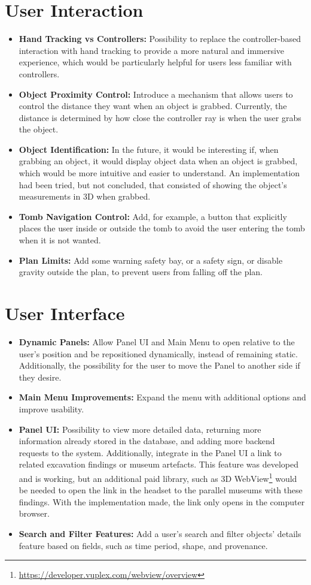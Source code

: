\section*{User Interaction}
\begin{itemize}
    \item \textbf{Hand Tracking vs Controllers:} Possibility to replace the controller-based interaction with hand tracking to provide a more natural and immersive experience, which would be particularly helpful for users less familiar with controllers.
    \item \textbf{Object Proximity Control:} Introduce a mechanism that allows users to control the distance they want when an object is grabbed. Currently, the distance is determined by how close the controller ray is when the user grabs the object.
    \item \textbf{Object Identification:} In the future, it would be interesting if, when grabbing an object, it would display object data when an object is grabbed, which would be more intuitive and easier to understand. An implementation had been tried, but not concluded, that consisted of showing the object's measurements in \gls{3D} when grabbed.
    \item \textbf{Tomb Navigation Control:} Add, for example, a button that explicitly places the user inside or outside the tomb to avoid the user entering the tomb when it is not wanted.
    \item \textbf{Plan Limits:} Add some warning safety bay, or a safety sign, or disable gravity outside the plan, to prevent users from falling off the plan.
\end{itemize}   

\section*{User Interface}
\begin{itemize}
    \item \textbf{Dynamic Panels:} Allow Panel \gls{UI} and Main Menu to open relative to the user’s position and be repositioned dynamically, instead of remaining static. Additionally, the possibility for the user to move the Panel to another side if they desire.
    \item \textbf{Main Menu Improvements:} Expand the menu with additional options and improve usability.
    \item \textbf{Panel UI:} Possibility to view more detailed data, returning more information already stored in the database, and adding more backend requests to the system. Additionally, integrate in the Panel \gls{UI} a link to related excavation findings or museum artefacts. This feature was developed and is working, but an additional paid library, such as \gls{3D} WebView\footnote{\url{https://developer.vuplex.com/webview/overview}} would be needed to open the link in the headset to the parallel museums with these findings. With the implementation made, the link only opens in the computer browser.
    \item \textbf{Search and Filter Features:} Add a user's search and filter objects' details feature based on fields, such as time period, shape, and provenance.
\end{itemize}

